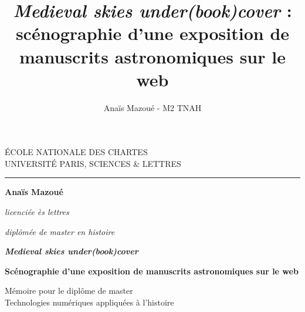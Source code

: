\documentclass[a4paper,12pt,twoside]{book}
\author{Anaïs Mazoué - M2 TNAH}
\title{\textit{Medieval skies under(book)cover} : scénographie d'une exposition de manuscrits astronomiques sur le web}
\begin{document}
	\begin{titlepage}
		\begin{center}
			
			\bigskip
			
			\begin{large}				
				ÉCOLE NATIONALE DES CHARTES\\
				UNIVERSITÉ PARIS, SCIENCES \& LETTRES
			\end{large}
			\begin{center}\rule{2cm}{0.02cm}\end{center}
			
			\bigskip
			\bigskip
			\bigskip
			\begin{Large}
				\textbf{Anaïs Mazoué}\\
			\end{Large}
			\begin{normalsize} 
			    \textit{licenciée ès lettres}
			    
				\textit{diplômée de master en histoire}
			\end{normalsize}
			
			\bigskip
			\bigskip
			\bigskip
			
			\begin{Huge}
				\textbf{\textit{Medieval skies under(book)cover}}\\
			\end{Huge}
			\bigskip
			\bigskip
			\begin{LARGE}
				\textbf{Scénographie d'une exposition de manuscrits astronomiques sur le web}\\
			\end{LARGE}
			
			\bigskip
			\bigskip
			\bigskip
			\begin{large}
			\end{large}
			\vfill
			
			\begin{large}
				Mémoire pour le diplôme de master \\
				\og{} Technologies numériques appliquées à l'histoire \fg{} \\
			\end{large}
			
		\end{center}
	\end{titlepage}
	
	\thispagestyle{empty}	
	\cleardoublepage
	
	\frontmatter
	
	
\end{document}

